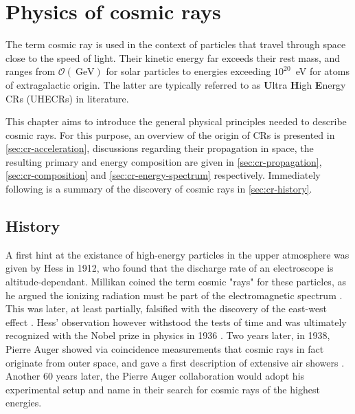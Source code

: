 
\chapter{Physics of cosmic rays}
\label{chap:physical-background}

The term cosmic ray is used in the context of particles that travel through space close to the speed of light. Their kinetic energy far exceeds their rest mass, 
and ranges from $\mathcal{O}(\SI{}{\giga\electronvolt})$ for solar particles to energies exceeding $10^{20}$\SI{}{\electronvolt} for atoms of extragalactic origin. 
The latter are typically referred to as \textbf{U}ltra \textbf{H}igh \textbf{E}nergy CRs (UHECRs) in literature.

This chapter aims to introduce the general physical principles needed to describe cosmic rays. For this purpose, an overview of the origin of CRs is presented in
\autoref{sec:cr-acceleration}, discussions regarding their propagation in space, the resulting primary and energy composition are given in 
\autoref{sec:cr-propagation}, \autoref{sec:cr-composition} and \autoref{sec:cr-energy-spectrum} respectively. Immediately following is a summary of the discovery of cosmic rays in \autoref{sec:cr-history}.

\section{History}
\label{sec:cr-history}

A first hint at the existance of high-energy particles in the upper atmosphere was given by Hess in 1912, who found that the discharge rate of an electroscope is 
altitude-dependant. Millikan coined the term cosmic "rays" for these particles, as he argued the ionizing radiation must be part of the electromagnetic spectrum 
\cite{millikan1928origin}. This was later, at least partially, falsified with the discovery of the east-west effect \cite{johnson1938note}. Hess' observation 
however withstood the tests of time and was ultimately recognized with the Nobel prize in physics in 1936 \cite{nobelprize1936}. Two years later, in 1938, Pierre 
Auger showed via coincidence measurements that cosmic rays in fact originate from outer space, and gave a first description of extensive air showers 
\cite{auger1939extensive}. Another 60 years later, the Pierre Auger collaboration would adopt his experimental setup and name in their search for cosmic rays of 
the highest energies.

